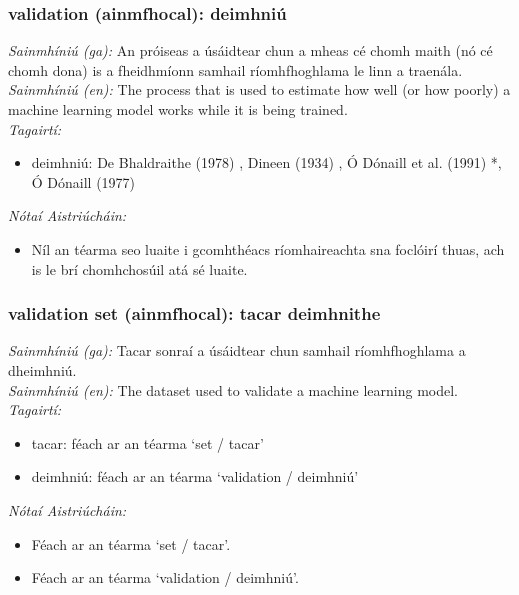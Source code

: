 \subsubsection*{validation (ainmfhocal): deimhniú}
 \noindent \textit{Sainmhíniú (ga):} An próiseas a úsáidtear chun a mheas cé chomh maith (nó cé chomh dona) is a fheidhmíonn samhail ríomhfhoghlama le linn a traenála.
\\
 \noindent \textit{Sainmhíniú (en):} The process that is used to estimate how well (or how poorly) a machine learning model works while it is being trained.
\\
 \noindent \textit{Tagairtí:}
\begin{itemize}
	\item deimhniú: De Bhaldraithe (1978) \cite{de-bhaldraithe}, Dineen (1934) \cite{dineen}, Ó Dónaill et al. (1991) \cite{focloir-beag}*, Ó Dónaill (1977) \cite{odonaill}
\end{itemize}

 \noindent \textit{Nótaí Aistriúcháin:}
\begin{itemize}
	\item Níl an téarma seo luaite i gcomhthéacs ríomhaireachta sna foclóirí thuas, ach is le brí chomhchosúil atá sé luaite.
\end{itemize}


\subsubsection*{validation set (ainmfhocal): tacar deimhnithe}
 \noindent \textit{Sainmhíniú (ga):} Tacar sonraí a úsáidtear chun samhail ríomhfhoghlama a dheimhniú.
\\
 \noindent \textit{Sainmhíniú (en):} The dataset used to validate a machine learning model.
\\
 \noindent \textit{Tagairtí:}
\begin{itemize}
	\item tacar: féach ar an téarma `set / tacar'
	\item deimhniú: féach ar an téarma `validation / deimhniú'
\end{itemize}

 \noindent \textit{Nótaí Aistriúcháin:}
\begin{itemize}
	\item Féach ar an téarma `set / tacar'.
	\item Féach ar an téarma `validation / deimhniú'.
\end{itemize}


